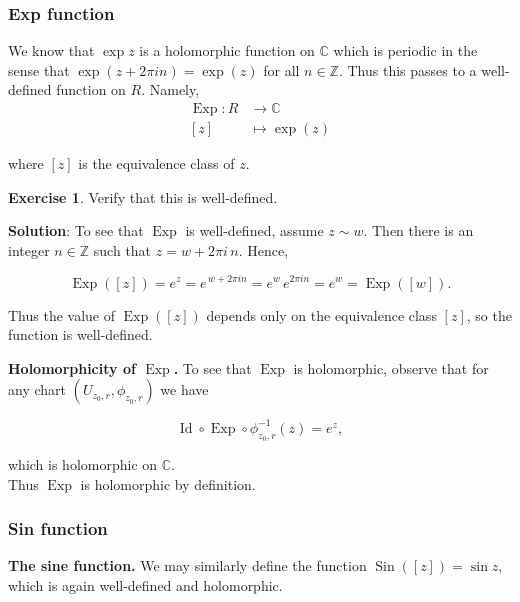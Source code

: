 \documentclass[
]{book}
\theoremstyle{definition}
\theoremstyle{definition}
\theoremstyle{definition}
\newtheorem{exercise}{Exercise}[chapter]
\theoremstyle{definition}
\theoremstyle{remark}
\begin{document}
\subsubsection{Exp function}\label{exp-function}

We know that \(\exp z\) is a holomorphic function on \(\mathbb{C}\) which is periodic in the sense that \(\exp(z + 2\pi i n) = \exp(z)\) for all \(n \in \mathbb{Z}.\) Thus this passes to a well-defined function on \(R\). Namely,
\begin{align}
\operatorname{Exp} : R &\longrightarrow \mathbb{C}\\
[z] &\longmapsto \exp(z)
\end{align}

where \([z]\) is the equivalence class of \(z\).

\begin{exercise}
\protect\hypertarget{exr:unnamed-chunk-14}{}\label{exr:unnamed-chunk-14}Verify that this is well-defined.
\end{exercise}

\textbf{Solution}: To see that \(\operatorname{Exp}\) is well-defined, assume \(z \sim w\).
Then there is an integer \(n \in \mathbb{Z}\) such that \(z = w + 2\pi i\, n.\) Hence,

\[
\operatorname{Exp}([z]) = e^{z}
= e^{\,w + 2\pi i n}
= e^{w}\, e^{2\pi i n}
= e^{w}
= \operatorname{Exp}([w]).
\]

Thus the value of \(\operatorname{Exp}([z])\) depends only on the equivalence class \([z]\),
so the function is well-defined.

\medskip

\textbf{Holomorphicity of \(\operatorname{Exp}\).}
To see that \(\operatorname{Exp}\) is holomorphic, observe that for any chart
\((U_{z_0,r}, \phi_{z_0,r})\) we have

\[
\operatorname{Id}\circ\operatorname{Exp} \circ \phi_{z_0,r}^{-1}(z)
= e^{z},
\]

which is holomorphic on \(\mathbb{C}\).\\
Thus \(\operatorname{Exp}\) is holomorphic by definition.

\subsubsection{Sin function}\label{sin-function}

\textbf{The sine function.}
We may similarly define the function
\(\operatorname{Sin}([z]) = \sin z,\)
which is again well-defined and holomorphic.
\end{document}
